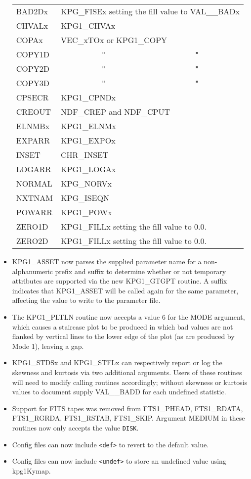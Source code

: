 \begin{itemize}
\begin{tabular}{lcc}
BAD2Dx  & \multicolumn{2}{l}{KPG\_FISEx setting the fill value to VAL\_\_BADx} \\
CHVALx  & \multicolumn{2}{l}{KPG1\_CHVAx} \\
COPAx   & \multicolumn{2}{l}{VEC\_xTOx or KPG1\_COPY} \\
COPY1D  & {\tt "}   & {\tt "}  \\
COPY2D  & {\tt "}   & {\tt "}  \\
COPY3D  & {\tt "}   & {\tt "}  \\
CPSECR  & \multicolumn{2}{l}{KPG1\_CPNDx} \\
CREOUT  & \multicolumn{2}{l}{NDF\_CREP and NDF\_CPUT} \\
ELNMBx  & \multicolumn{2}{l}{KPG1\_ELNMx} \\
EXPARR  & \multicolumn{2}{l}{KPG1\_EXPOx} \\
INSET   & \multicolumn{2}{l}{CHR\_INSET} \\
LOGARR  & \multicolumn{2}{l}{KPG1\_LOGAx} \\
NORMAL  & \multicolumn{2}{l}{KPG\_NORVx} \\
NXTNAM  & \multicolumn{2}{l}{KPG\_ISEQN} \\
POWARR  & \multicolumn{2}{l}{KPG1\_POWx} \\
ZERO1D  & \multicolumn{2}{l}{KPG1\_FILLx setting the fill value to 0.0. } \\
ZERO2D  & \multicolumn{2}{l}{KPG1\_FILLx setting the fill value to 0.0. } \\
\end{tabular}

\item KPG1\_ASSET now parses the supplied parameter name for a
      non-alphanumeric prefix and suffix to determine whether or not
      temporary attributes are supported via the new KPG1\_GTGPT
      routine.  A suffix indicates that KPG1\_ASSET will be called
      again for the same parameter, affecting the value to write to
      the parameter file.
\item The KPG1\_PLTLN routine now accepts a value 6 for the MODE
      argument, which causes a staircase plot to be produced in which
      bad values are not flanked by vertical lines to the lower edge
      of the plot (as are produced by Mode 1), leaving a gap.
\item KPG1\_STDSx and KPG1\_STFLx can respectively report or log the
      skewness and kurtosis via two additional arguments.  Users of
      these routines will need to modify calling routines accordingly;
      without skewness or kurtosis values to document supply
      VAL\_\_BADD for each undefined statistic.
\item Support for FITS tapes was removed from FTS1\_PHEAD, FTS1\_RDATA,
      FTS1\_RGRDA, FTS1\_RSTAB, FTS1\_SKIP.  Argument MEDIUM in these
      routines now only accepts the value {\tt DISK}.

\item Config files can now include {\tt <def>} to revert to the default value.
\item Config files can now include {\tt <undef>} to store an undefined
      value using kpg1Kymap.
\end{itemize}


